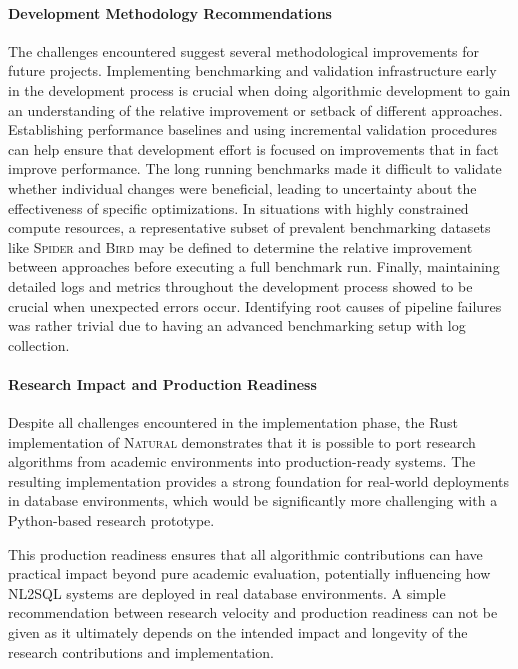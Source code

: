 \paragraph{Development Methodology Recommendations}

The challenges encountered suggest several methodological improvements for
future projects. Implementing benchmarking and validation infrastructure early
in the development process is crucial when doing algorithmic development to
gain an understanding of the relative improvement or setback of different
approaches. Establishing performance baselines and using incremental validation
procedures can help ensure that development effort is focused on improvements
that in fact improve performance. The long running benchmarks made it difficult
to validate whether individual changes were beneficial, leading to uncertainty
about the effectiveness of specific optimizations. In situations with highly
constrained compute resources, a representative subset of prevalent
benchmarking datasets like \textsc{Spider} and \textsc{Bird} may be defined to
determine the relative improvement between approaches before executing a full
benchmark run. Finally, maintaining detailed logs and metrics throughout the
development process showed to be crucial when unexpected errors occur.
Identifying root causes of pipeline failures was rather trivial due to having
an advanced benchmarking setup with log collection.

\paragraph{Research Impact and Production Readiness}

Despite all challenges encountered in the implementation phase, the Rust
implementation of \textsc{Natural} demonstrates that it is possible to port
research algorithms from academic environments into production-ready systems.
The resulting implementation provides a strong foundation for real-world
deployments in database environments, which would be significantly more
challenging with a Python-based research prototype.

This production readiness ensures that all algorithmic contributions can have
practical impact beyond pure academic evaluation, potentially influencing how
NL2SQL systems are deployed in real database environments. A simple
recommendation between research velocity and production readiness can not be
given as it ultimately depends on the intended impact and longevity of the
research contributions and implementation.
